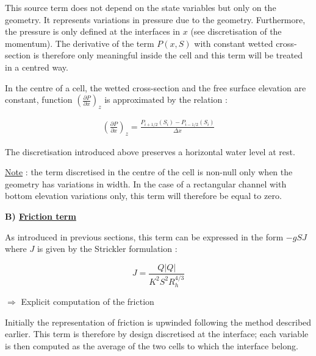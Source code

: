 This source term does not depend on the state variables but only on the geometry. It represents variations in pressure due to the geometry. Furthermore, the pressure is only defined at the interfaces in $x$ (see discretisation of the momentum). The derivative of the term $P(x,S)$ with constant wetted cross-section is therefore only meaningful inside the cell and this term will be treated in a centred way.

\vspace{0.5cm}

In the centre of a cell, the wetted cross-section and the free surface elevation are constant, function $\left ( \frac{\partial P}{\partial x} \right )_z$ is approximated by the relation :

\begin{eqnarray}
 & \left ( \frac{\partial P}{\partial x} \right )_z = \frac{P_{i+1/2}(S_i) - P_{i-1/2}(S_i)}{\Delta x} & \nonumber
\end{eqnarray}

\vspace{0.5cm}

The discretisation introduced above preserves a horizontal water level at rest.

\vspace{0.5cm}

\underline{Note} : the term discretised in the centre of the cell is non-null only when the geometry has variations in width. In the case of a rectangular channel with bottom elevation variations only, this term will therefore be equal to zero.

\vspace{0.5cm}

\textbf{B) \underline{Friction term}}

\vspace{0.5cm}

As introduced in previous sections, this term can be expressed in the form  $-g S J$ where $J$ is given by the Strickler formulation :

\begin{equation}
 J = \frac{Q|Q|}{K^2 S^2 R_{h}^{4/3}}
\end{equation}

\vspace{0.5cm}

$\Longrightarrow$ Explicit computation of the friction 

\vspace{0.5cm}

Initially the representation of friction is upwinded following the method described earlier. This term is therefore by design discretised at the interface; each variable is then computed as the average of the two cells to which the interface belong.

